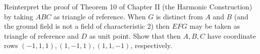 Reinterpret the proof of Theorem 10 of Chapter II (the Harmonic Construction) by taking $ABC$ as triangle of reference. When $G$ is distinct from $A$ and $B$ (and the ground field is not a field of characteristic 2) then $EFG$ may be taken as triangle of reference and $D$ as unit point. Show that then $A, B, C$ have coordinate rows $(-1, 1, 1), (1, -1, 1), (1, 1, -1)$, respectively.

